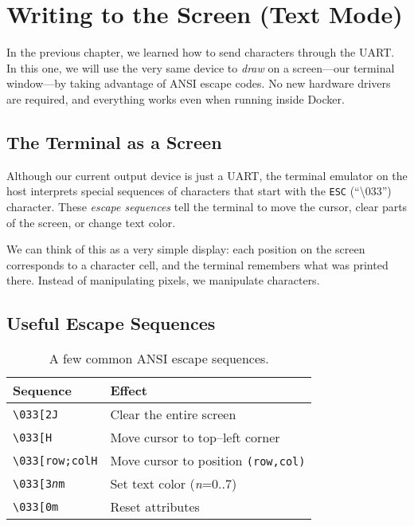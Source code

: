 \chapter{Writing to the Screen (Text Mode)}
\label{chap:textscreen}

In the previous chapter, we learned how to send characters through the UART.
In this one, we will use the very same device to \emph{draw} on a screen—our
terminal window—by taking advantage of ANSI escape codes.  No new hardware
drivers are required, and everything works even when running inside Docker.

\section{The Terminal as a Screen}

Although our current output device is just a UART, the terminal emulator on the
host interprets special sequences of characters that start with the \texttt{ESC}
(``\textbackslash033'') character.  These \emph{escape sequences} tell the
terminal to move the cursor, clear parts of the screen, or change text color.

We can think of this as a very simple display: each position on the screen
corresponds to a character cell, and the terminal remembers what was printed
there.  Instead of manipulating pixels, we manipulate characters.

\section{Useful Escape Sequences}

\begin{table}[h]
  \centering
  \begin{tabular}{ll}
    \toprule
    Sequence & Effect \\
    \midrule
    \texttt{\textbackslash033[2J} & Clear the entire screen \\
    \texttt{\textbackslash033[H}  & Move cursor to top--left corner \\
    \texttt{\textbackslash033[row;colH} & Move cursor to position \texttt{(row,col)} \\
    \texttt{\textbackslash033[3\emph{n}m} & Set text color (\emph{n}=0..7) \\
    \texttt{\textbackslash033[0m} & Reset attributes \\
    \bottomrule
  \end{tabular}
  \caption{A few common ANSI escape sequences.}
\end{table}

